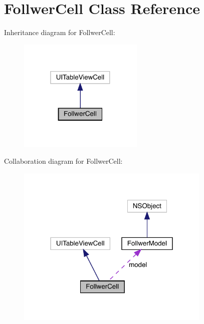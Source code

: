 \hypertarget{interface_follwer_cell}{}\section{Follwer\+Cell Class Reference}
\label{interface_follwer_cell}


Inheritance diagram for Follwer\+Cell\+:\nopagebreak
\begin{figure}[H]
\begin{center}
\leavevmode
\includegraphics[width=169pt]{interface_follwer_cell__inherit__graph}
\end{center}
\end{figure}


Collaboration diagram for Follwer\+Cell\+:\nopagebreak
\begin{figure}[H]
\begin{center}
\leavevmode
\includegraphics[width=262pt]{interface_follwer_cell__coll__graph}
\end{center}
\end{figure}
